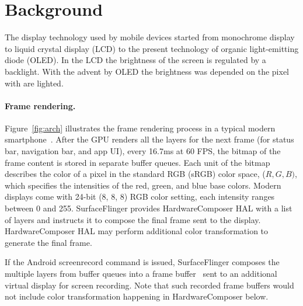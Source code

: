 \section{Background}
\label{sec:back}

The display technology used by mobile devices started from monochrome display
to liquid crystal display (LCD) to the present technology of organic
light-emitting diode (OLED).
In the LCD the brightness of the screen is regulated by a backlight. With the
advent by OLED the brightness was depended on the pixel with are lighted.
\fi

\paragraph{Frame rendering.}
Figure~\ref{fig:arch} illustrates the frame rendering process in a
typical modern smartphone~\cite{arch_graphicspipeline}.
After the GPU renders all the layers for the next frame
(for status bar, navigation bar, and app UI),
\eg every 16.7ms at 60 FPS, 
the bitmap of the frame content is stored in separate buffer queues.
%
Each unit of the bitmap describes the color of
a pixel in the standard RGB (sRGB) color space, ($R, G,
B)$, which specifies the intensities of the red, green, and blue base
colors.  Modern displays come with 24-bit (8, 8, 8) RGB color setting,
\ie each intensity ranges between 0 and 255.
%
SurfaceFlinger provides HardwareComposer HAL with a list of layers and
instructs it to compose the final frame sent to the display.
HardwareComposer HAL may perform additional color transformation to
generate the final frame.

If the Android screenrecord command is issued, SurfaceFlinger composes
the multiple layers from buffer queues into a frame
buffer~\cite{arch_surfaceflinger} sent to an additional virtual
display for screen recording. Note that such recorded frame buffers would not
include color transformation happening in HardwareComposer below.

